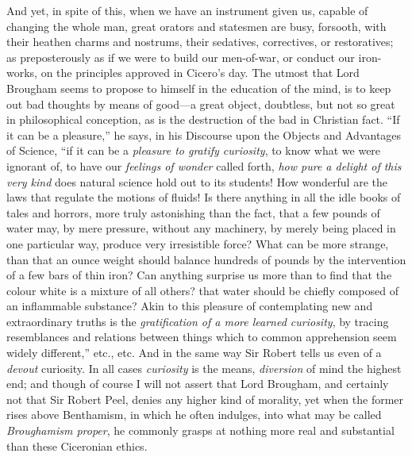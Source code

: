 And yet, in spite of this, when we have an instrument given us,
capable of changing the whole man, great orators and statesmen are
busy, forsooth, with their heathen charms and nostrums, their
sedatives, correctives, or restoratives; as preposterously as if we
were to build our men-of-war, or conduct our iron-works, on the
principles approved in Cicero's day. The utmost that Lord Brougham
seems to propose to himself in the education of the mind, is to keep
out bad thoughts by means of good—a great object, doubtless, but not
so great in philosophical conception, as is the destruction of the bad
in Christian fact. ``If it can be a pleasure,'' he says, in
his Discourse upon the Objects and Advantages of Science, ``if it
can be a \emph{pleasure to gratify curiosity}, to know what we were
ignorant of, to have our \emph{feelings of wonder} called forth, \emph{how
pure a delight of this very kind} does natural science hold out to
its students! How wonderful are the laws that regulate the motions of
fluids! Is there anything in all the idle books of tales and horrors,
more truly astonishing than the fact, that a few pounds of water
may, by mere pressure, without any machinery, by merely being placed
in one particular way, produce very irresistible force? What can be
more strange, than that an ounce weight should balance hundreds of
pounds by the intervention of a few bars of thin iron? Can anything
surprise us more than to find that the colour white is a mixture of
all others? that water should be chiefly composed of an inflammable
substance? Akin to this pleasure of contemplating new and
extraordinary truths is the \emph{gratification of a more learned
curiosity}, by tracing resemblances and relations between things
which to common apprehension seem widely different,'' etc., etc.
And in the same way Sir Robert tells us even of a \emph{devout}
curiosity. In all cases \emph{curiosity} is the means, \emph{diversion}
of mind the highest end; and though of course I will not assert that
Lord Brougham, and certainly not that Sir Robert Peel, denies any
higher kind of morality, yet when the former rises above Benthamism,
in which he often indulges, into what may be called \emph{Broughamism
proper}, he commonly grasps at nothing more real and substantial
than these Ciceronian ethics.

